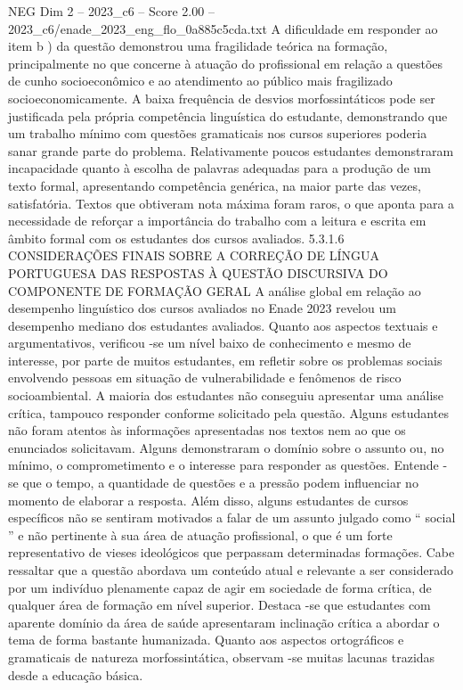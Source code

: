 \begin{textsample}{NEG Dim 2 – 2023\_c6 – Score 2.00 – 2023\_c6/enade\_2023\_eng\_flo\_0a885c5cda.txt}
A dificuldade em responder ao item b ) da questão demonstrou uma fragilidade teórica na formação, principalmente no que concerne à atuação do profissional em relação a questões de cunho socioeconômico e ao atendimento ao público mais fragilizado socioeconomicamente.
A baixa frequência de desvios morfossintáticos pode ser justificada pela própria competência linguística do estudante, demonstrando que um trabalho mínimo com questões gramaticais nos cursos superiores poderia sanar grande parte do problema.
Relativamente poucos estudantes demonstraram incapacidade quanto à escolha de palavras adequadas para a produção de um texto formal, apresentando competência genérica, na maior parte das vezes, satisfatória.
Textos que obtiveram nota máxima foram raros, o que aponta para a necessidade de reforçar a importância do trabalho com a leitura e escrita em âmbito formal com os estudantes dos cursos avaliados. 5.3.1.6 CONSIDERAÇÕES FINAIS SOBRE A CORREÇÃO DE LÍNGUA PORTUGUESA DAS RESPOSTAS À QUESTÃO DISCURSIVA DO COMPONENTE DE FORMAÇÃO GERAL A análise global em relação ao desempenho linguístico dos cursos avaliados no Enade 2023 revelou um desempenho mediano dos estudantes avaliados.
Quanto aos aspectos textuais e argumentativos, verificou -se um nível baixo de conhecimento e mesmo de interesse, por parte de muitos estudantes, em refletir sobre os problemas sociais envolvendo pessoas em situação de vulnerabilidade e fenômenos de risco socioambiental.
A maioria dos estudantes não conseguiu apresentar uma análise crítica, tampouco responder conforme solicitado pela questão.
Alguns estudantes não foram atentos às informações apresentadas nos textos nem ao que os enunciados solicitavam.
Alguns demonstraram o domínio sobre o assunto ou, no mínimo, o comprometimento e o interesse para responder as questões.
Entende -se que o tempo, a quantidade de questões e a pressão podem influenciar no momento de elaborar a resposta.
Além disso, alguns estudantes de cursos específicos não se sentiram motivados a falar de um assunto julgado como “ social ” e não pertinente à sua área de atuação profissional, o que é um forte representativo de vieses ideológicos que perpassam determinadas formações.
Cabe ressaltar que a questão abordava um conteúdo atual e relevante a ser considerado por um indivíduo plenamente capaz de agir em sociedade de forma crítica, de qualquer área de formação em nível superior.
Destaca -se que estudantes com aparente domínio da área de saúde apresentaram inclinação crítica a abordar o tema de forma bastante humanizada.
Quanto aos aspectos ortográficos e gramaticais de natureza morfossintática, observam -se muitas lacunas trazidas desde a educação básica.

\end{textsample}

